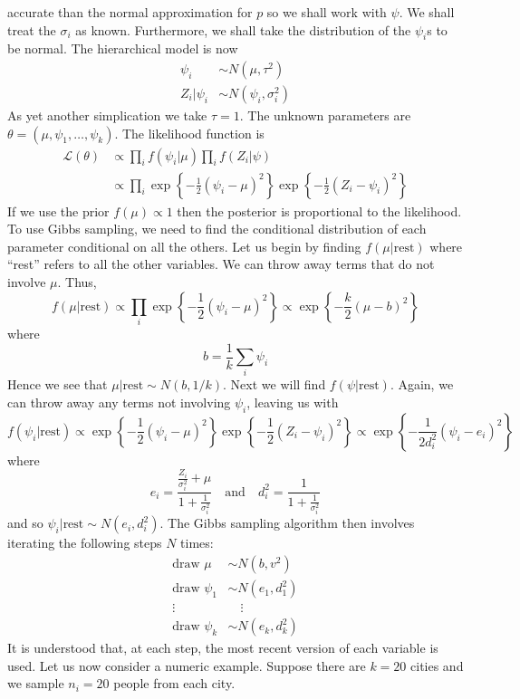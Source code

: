 accurate than the normal approximation for \(p\) so we shall work with
\(\psi\). We shall treat the \(\sigma_{i}\) as known. Furthermore, we
shall take the distribution of the \(\psi_{i}\)s to be normal. The
hierarchical model is now
\begin{align*}
\psi_{i} &\sim N(\mu, \tau^{2}) \\
Z_{i} | \psi_{i} &\sim N(\psi_{i}, \sigma_{i}^{2})
\end{align*}
As yet another simplication we take \(\tau = 1\). The unknown parameters
are \(\theta = (\mu, \psi_{1}, \dots, \psi_{k})\). The likelihood function
is
\begin{align*}
\mathcal{L}(\theta) 
&\propto \prod_{i} f(\psi_{i} | \mu) \prod_{i} f(Z_{i} | \psi) \\
&\propto \prod _{i} \exp \left\{-\frac{1}{2} (\psi_{i} - \mu)^{2} \right\} \exp \left\{ -\frac{1}{2} (Z_{i} - \psi_{i})^{2} \right\}
\end{align*}
If we use the prior \(f(\mu) \propto 1\) then the posterior is
proportional to the likelihood. To use Gibbs sampling, we need to find
the conditional distribution of each parameter conditional on all the
others. Let us begin by finding \(f(\mu | \text{rest})\) where ``rest''
refers to all the other variables. We can throw away terms that do not
involve \(\mu\). Thus,
\[
f(\mu | \text{rest}) \propto \prod_{i} \exp \left\{ -\frac{1}{2} (\psi_{i} - \mu)^{2} \right\} \propto \exp \left\{ -\frac{k}{2} (\mu - b)^{2} \right\}
\]
where
\[
b = \frac{1}{k} \sum_{i} \psi_{i}
\]
Hence we see that \(\mu | \text{rest} \sim N(b, 1 / k)\).
Next we will find \(f(\psi | \text{rest})\). Again, we can throw away
any terms not involving \(\psi_{i}\), leaving us with
\[
f(\psi_{i} | \text{rest}) \propto \exp \left\{-\frac{1}{2} (\psi_{i} - \mu)^{2} \right\} \exp \left\{ -\frac{1}{2} (Z_{i} - \psi_{i})^{2} \right\} \propto \exp \left\{ -\frac{1}{2d_{i}^{2}}(\psi_{i} - e_{i})^{2} \right\}
\]
where
\[
e_{i} = \frac{\frac{Z_{i}}{\sigma_{i}^{2}} + \mu}{1 + \frac{1}{\sigma_{i}^{2}}}
\quad \text{and} \quad
d_{i}^{2} = \frac{1}{1 + \frac{1}{\sigma_{i}^{2}}}
\]
and so \(\psi_{i} | \text{rest} \sim N(e_{i}, d_{i}^{2})\).
The Gibbs sampling algorithm then involves iterating the following steps
\(N\) times:
\begin{align*}
\text{draw } \mu &\sim N(b, v^{2}) \\
\text{draw } \psi_{1} &\sim N(e_{1}, d_{1}^{2}) \\
\vdots & \quad \vdots \\
\text{draw } \psi_{k} &\sim N(e_{k}, d_{k}^{2})
\end{align*}
It is understood that, at each step, the most recent version of each
variable is used.
Let us now consider a numeric example. Suppose there are \(k = 20\)
cities and we sample \(n_{i} = 20\) people from each city.

